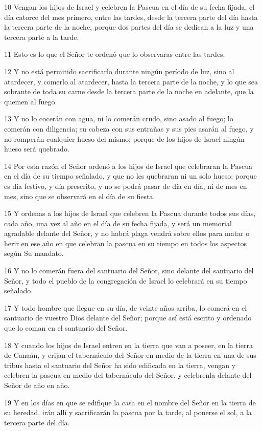 \par 10 Vengan los hijos de Israel y celebren la Pascua en el día de su fecha fijada, el día catorce del mes primero, entre las tardes, desde la tercera parte del día hasta la tercera parte de la noche, porque dos partes del día se dedican a la luz y una tercera parte a la tarde.
\par 11 Esto es lo que el Señor te ordenó que lo observaras entre las tardes.
\par 12 Y no está permitido sacrificarlo durante ningún período de luz, sino al atardecer, y comerlo al atardecer, hasta la tercera parte de la noche, y lo que sea sobrante de toda su carne desde la tercera parte de la noche en adelante, que la quemen al fuego.
\par 13 Y no lo cocerán con agua, ni lo comerán crudo, sino asado al fuego; lo comerán con diligencia; su cabeza con sus entrañas y sus pies asarán al fuego, y no romperán cualquier hueso del mismo; porque de los hijos de Israel ningún hueso será quebrado.
\par 14 Por esta razón el Señor ordenó a los hijos de Israel que celebraran la Pascua en el día de su tiempo señalado, y que no les quebraran ni un solo hueso; porque es día festivo, y día prescrito, y no se podrá pasar de día en día, ni de mes en mes, sino que se observará en el día de su fiesta.
\par 15 Y ordenas a los hijos de Israel que celebren la Pascua durante todos sus días, cada año, una vez al año en el día de su fecha fijada, y será un memorial agradable delante del Señor, y no habrá plaga vendrá sobre ellos para matar o herir en ese año en que celebran la pascua en su tiempo en todos los aspectos según Su mandato.
\par 16 Y no lo comerán fuera del santuario del Señor, sino delante del santuario del Señor, y todo el pueblo de la congregación de Israel lo celebrará en su tiempo señalado.
\par 17 Y todo hombre que llegue en su día, de veinte años arriba, lo comerá en el santuario de vuestro Dios delante del Señor; porque así está escrito y ordenado que lo coman en el santuario del Señor.
\par 18 Y cuando los hijos de Israel entren en la tierra que van a poseer, en la tierra de Canaán, y erijan el tabernáculo del Señor en medio de la tierra en una de sus tribus hasta el santuario del Señor ha sido edificada en la tierra, vengan y celebren la pascua en medio del tabernáculo del Señor, y celebrenla delante del Señor de año en año.
\par 19 Y en los días en que se edifique la casa en el nombre del Señor en la tierra de su heredad, irán allí y sacrificarán la pascua por la tarde, al ponerse el sol, a la tercera parte del día.
